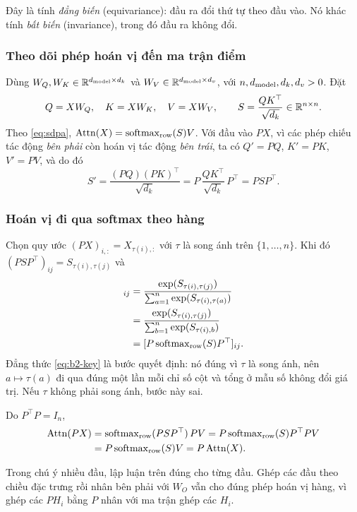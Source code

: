 Đây là tính \emph{đẳng biến} (equivariance): đầu ra đổi thứ tự theo đầu vào. Nó
khác tính \emph{bất biến} (invariance), trong đó đầu ra không đổi.

\subsubsection{Theo dõi phép hoán vị đến ma trận điểm}

Dùng $W_Q,W_K\in\mathbb{R}^{d_{\mathrm{model}}\times d_k}$ và $W_V\in\mathbb{R}^{d_{\mathrm{model}}\times d_v}$, với
$n,d_{\mathrm{model}},d_k,d_v>0$. Đặt
\[
  Q=XW_Q,\quad K=XW_K,\quad V=XW_V,\qquad
  S=\frac{QK^\top}{\sqrt{d_k}}\in\mathbb{R}^{n\times n}.
\]
Theo \eqref{eq:sdpa}, $\operatorname{Attn}(X)=\operatorname{softmax}_{\mathrm{row}}(S)V$. Với đầu vào $PX$, vì
các phép chiếu tác động \emph{bên phải} còn hoán vị tác động \emph{bên trái}, ta có
$Q'=PQ$, $K'=PK$, $V'=PV$, và do đó
\[
  S'=\frac{(PQ)(PK)^\top}{\sqrt{d_k}}=P\,\frac{QK^\top}{\sqrt{d_k}}\,P^\top=PSP^\top.
\]

\subsubsection{Hoán vị đi qua softmax theo hàng}

Chọn quy ước $(PX)_{i,:}=X_{\tau(i),:}$ với $\tau$ là song ánh trên
$\{1,\ldots,n\}$. Khi đó $(PSP^\top)_{ij}=S_{\tau(i),\tau(j)}$ và
\begin{align}
  [\softmax_{\mathrm{row}}(PSP^\top)]_{ij}
    &=\frac{\exp(S_{\tau(i),\tau(j)})}{\sum_{a=1}^{n}\exp(S_{\tau(i),\tau(a)})}
     \notag\\
    &=\frac{\exp(S_{\tau(i),\tau(j)})}{\sum_{b=1}^{n}\exp(S_{\tau(i),b})}
     \label{eq:b2-key}\\
    &=[P\softmax_{\mathrm{row}}(S)P^\top]_{ij}.\notag
\end{align}
Đẳng thức \eqref{eq:b2-key} là bước quyết định: nó đúng vì $\tau$ là song ánh, nên
$a\mapsto\tau(a)$ đi qua đúng một lần mỗi chỉ số cột và tổng ở mẫu số không đổi
giá trị. Nếu $\tau$ không phải song ánh, bước này sai.

Do $P^\top P=I_n$,
\begin{align*}
  \operatorname{Attn}(PX)
    &=\operatorname{softmax}_{\mathrm{row}}(PSP^\top)\,PV
     =P\operatorname{softmax}_{\mathrm{row}}(S)P^\top PV\\
    &=P\operatorname{softmax}_{\mathrm{row}}(S)V=P\operatorname{Attn}(X).
\end{align*}

Trong chú ý nhiều đầu, lập luận trên đúng cho từng đầu. Ghép các đầu theo chiều đặc
trưng rồi nhân bên phải với $W_O$ vẫn cho đúng phép hoán vị hàng, vì ghép các
$PH_i$ bằng $P$ nhân với ma trận ghép các $H_i$.

